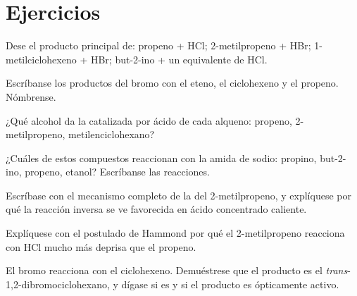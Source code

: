 \section{Ejercicios}

\begin{exercise}[$\star$]\label{exo:b1:electrophilic-additions:1}
Dese el producto principal de: propeno + HCl; 2-metilpropeno + HBr;
1-metilciclohexeno + HBr; but-2-ino + un equivalente de HCl.
\end{exercise}

\begin{exercise}[$\star$]\label{exo:b1:electrophilic-additions:2}
Escríbanse los productos del bromo con el eteno, el ciclohexeno y el
propeno. Nómbrense.
\end{exercise}

\begin{exercise}[$\star$]\label{exo:b1:electrophilic-additions:3}
¿Qué alcohol da la  catalizada por ácido de cada alqueno:
propeno, 2-metilpropeno, metilenciclohexano?
\end{exercise}

\begin{exercise}[$\star$]\label{exo:b1:electrophilic-additions:4}
¿Cuáles de estos compuestos reaccionan con la amida de sodio: propino,
but-2-ino, propeno, etanol? Escríbanse las reacciones.
\end{exercise}

\begin{exercise}[$\star\star$]\label{exo:b1:electrophilic-additions:5}
Escríbase con  el mecanismo completo de la  del
2-metilpropeno, y explíquese por qué la reacción inversa se ve favorecida
en ácido concentrado caliente.
\end{exercise}

\begin{exercise}[$\star\star$]\label{exo:b1:electrophilic-additions:6}
Explíquese con el postulado de Hammond por qué el 2-metilpropeno
reacciona con HCl mucho más deprisa que el propeno.
\end{exercise}

\begin{exercise}[$\star\star$]\label{exo:b1:electrophilic-additions:7}
El bromo reacciona con el ciclohexeno. Demuéstrese que el producto es el
\textit{trans}-1,2-dibromociclohexano, y dígase si es  y si el
producto es ópticamente activo.
\end{exercise}

